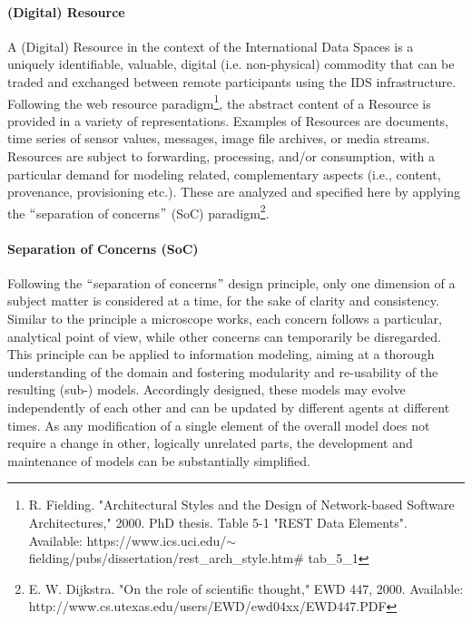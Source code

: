 \paragraph{(Digital) Resource\\}
A (Digital) Resource in the context of the International Data Spaces is a uniquely identifiable, valuable, digital (i.e. non-physical) commodity that can be traded and exchanged between remote participants using the IDS infrastructure. Following the web resource paradigm\footnote{ R. Fielding.  "Architectural Styles and the Design of Network-based Software Architectures," 2000.   PhD thesis.  Table 5-1 "REST Data Elements".  Available: https://www.ics.uci.edu/$ \sim $ fielding/pubs/dissertation/rest\_arch\_style.htm$\#$ tab\_5\_1 }, the abstract content of a Resource is provided in a variety of representations. Examples of Resources are documents, time series of sensor values, messages, image file archives, or media streams. Resources are subject to forwarding, processing, and/or consumption, with a particular demand for modeling related, complementary aspects (i.e., content, provenance, provisioning etc.). These are analyzed and specified here by applying the $``$separation of concerns$"$  (SoC) paradigm\footnote{ E. W. Dijkstra.  "On the role of scientific thought," EWD 447, 2000.  Available: http://www.cs.utexas.edu/users/EWD/ewd04xx/EWD447.PDF }.


\paragraph{Separation of Concerns (SoC)\\}
Following the $``$separation of concerns$"$  design principle, only one dimension of a subject matter is considered at a time, for the sake of clarity and consistency. Similar to the principle a microscope works, each concern follows a particular, analytical point of view, while other concerns can temporarily be disregarded. This principle can be applied to information modeling, aiming at a thorough understanding of the domain and fostering modularity and re-usability of the resulting (sub-) models. Accordingly designed, these models may evolve independently of each other and can be updated by different agents at different times. As any modification of a single element of the overall model does not require a change in other, logically unrelated parts, the development and maintenance of models can be substantially simplified. 


